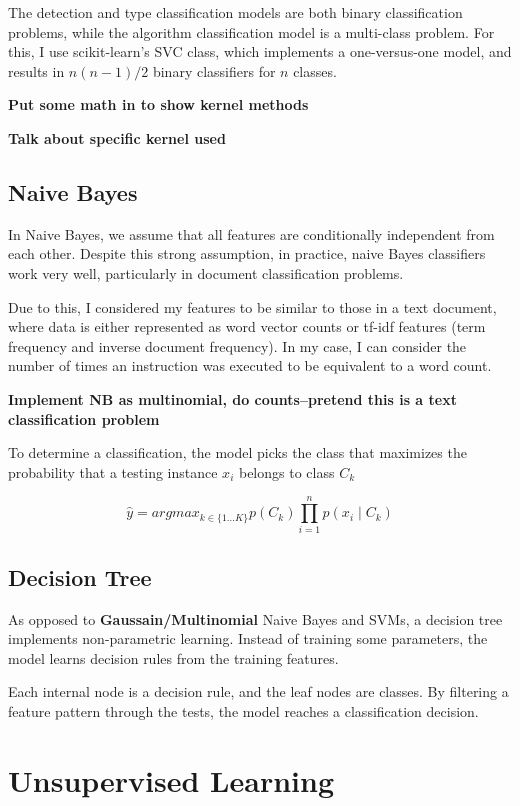 The detection and type classification models are both binary classification problems, while the algorithm classification model is a multi-class problem.  For this, I use scikit-learn's SVC class, which implements a one-versus-one model\cite{knerr}, and results in $n (n-1)/2$ binary classifiers for $n$ classes.

\textbf{Put some math in to show kernel methods}

\textbf{Talk about specific kernel used}

\subsection{Naive Bayes}
In Naive Bayes, we assume that all features are conditionally independent from each other.  Despite this strong assumption, in practice, naive Bayes classifiers work very well, particularly in document classification problems.

Due to this, I considered my features to be similar to those in a text document, where data is either represented as word vector counts or tf-idf features (term frequency and inverse document frequency).  In my case, I can consider the number of times an instruction was executed to be equivalent to a word count.

\textbf{Implement NB as multinomial, do counts--pretend this is a text classification problem}

To determine a classification, the model picks the class that maximizes the probability that a testing instance $x_i$ belongs to class $C_k$

\begin{equation}
\hat{y} = argmax_{k\in\{1\ldots K\}} p(C_k) \prod_{i=1}^n p(x_i \mid C_k) \label{naivebayes}
\end{equation}


\subsection{Decision Tree}
As opposed to \textbf{ Gaussain/Multinomial} Naive Bayes and SVMs, a decision tree implements non-parametric learning.  Instead of training some parameters, the model learns decision rules from the training features.

Each internal node is a decision rule, and the leaf nodes are classes.  By filtering a feature pattern through the tests, the model reaches a classification decision.




\section{Unsupervised Learning}
